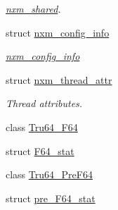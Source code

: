 \begin{DoxyCompactItemize}
\begin{DoxyCompactList}\small\item\em \hyperlink{structTru64_1_1nxm__shared}{nxm\_\-shared}. \item\end{DoxyCompactList}\item 
struct \hyperlink{structTru64_1_1nxm__config__info}{nxm\_\-config\_\-info}
\begin{DoxyCompactList}\small\item\em \hyperlink{structTru64_1_1nxm__config__info}{nxm\_\-config\_\-info} \item\end{DoxyCompactList}\item 
struct \hyperlink{structTru64_1_1nxm__thread__attr}{nxm\_\-thread\_\-attr}
\begin{DoxyCompactList}\small\item\em Thread attributes. \item\end{DoxyCompactList}\item 
class \hyperlink{classTru64__F64}{Tru64\_\-F64}
\item 
struct \hyperlink{structTru64__F64_1_1F64__stat}{F64\_\-stat}
\item 
class \hyperlink{classTru64__PreF64}{Tru64\_\-PreF64}
\item 
struct \hyperlink{structTru64__PreF64_1_1pre__F64__stat}{pre\_\-F64\_\-stat}
\end{DoxyCompactItemize}
